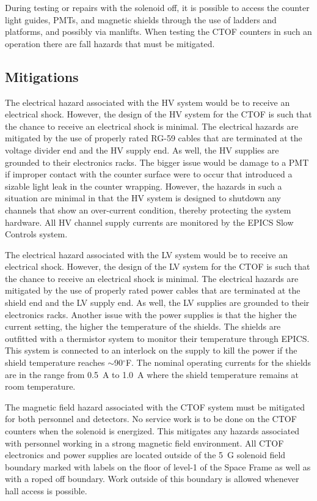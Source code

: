 During testing or repairs with the solenoid off, it is possible to access the counter light guides,
PMTs, and magnetic shields through the use of ladders and platforms, and possibly via manlifts. When
testing the CTOF counters in such an operation there are fall hazards that must be mitigated.

\subsection{Mitigations}

The electrical hazard associated with the HV system would be to receive an electrical shock. 
However, the design of the HV system for the CTOF is such that the chance to receive an 
electrical shock is minimal. The electrical hazards are mitigated by the use of properly
rated RG-59 cables that are terminated at the voltage divider end and the HV supply end. As 
well, the HV supplies are grounded to their electronics racks. The bigger issue would be 
damage to a PMT if improper contact with the counter surface were to occur that introduced 
a sizable light leak in the counter wrapping. However, the hazards in such a situation are 
minimal in that the HV system is designed to shutdown any channels that show an over-current
condition, thereby protecting the system hardware. All HV channel supply currents are monitored
by the EPICS Slow Controls system.

The electrical hazard associated with the LV system would be to receive an electrical shock. 
However, the design of the LV system for the CTOF is such that the chance to receive an 
electrical shock is minimal. The electrical hazards are mitigated by the use of properly
rated power cables that are terminated at the shield end and the LV supply end. As well, 
the LV supplies are grounded to their electronics racks. Another issue with the power 
supplies is that the higher the current setting, the higher the temperature of the shields. 
The shields are outfitted with a thermistor system to monitor their temperature through 
EPICS. This system is connected to an interlock on the supply to kill the power if the 
shield temperature reaches $\sim$90$^\circ$F. The nominal operating currents for the shields 
are in the range from 0.5~A to 1.0~A where the shield temperature remains at room temperature.

The magnetic field hazard associated with the CTOF system must be mitigated for both personnel
and detectors. No service work is to be done on the CTOF counters when the solenoid is energized.
This mitigates any hazards associated with personnel working in a strong magnetic field environment.
All CTOF electronics and power supplies are located outside of the 5~G solenoid field boundary
marked with labels on the floor of level-1 of the Space Frame as well as with a roped off
boundary. Work outside of this boundary is allowed whenever hall access is possible.


